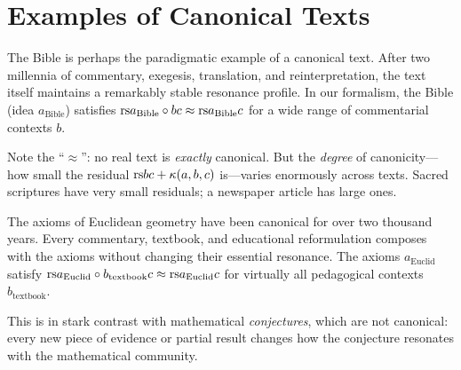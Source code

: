 \section{Examples of Canonical Texts}

\begin{example}
\label{ex:scripture}
The Bible is perhaps the paradigmatic example of a canonical text.  After two
millennia of commentary, exegesis, translation, and reinterpretation, the
text itself maintains a remarkably stable resonance profile.  In our formalism,
the Bible (idea $a_{\mathrm{Bible}}$) satisfies
$\mathrm{rs}{a_{\mathrm{Bible}} \circ b}{c} \approx \mathrm{rs}{a_{\mathrm{Bible}}}{c}$
for a wide range of commentarial contexts $b$.

Note the ``$\approx$'': no real text is \emph{exactly} canonical.  But the
\emph{degree} of canonicity---how small the residual
$\mathrm{rs}{b}{c} + \kappa(a, b, c)$ is---varies enormously across texts.  Sacred
scriptures have very small residuals; a newspaper article has large ones.
\end{example}

\begin{example}
\label{ex:axioms}
The axioms of Euclidean geometry have been canonical for over two thousand
years.  Every commentary, textbook, and educational reformulation composes
with the axioms without changing their essential resonance.  The axioms
$a_{\mathrm{Euclid}}$ satisfy
$\mathrm{rs}{a_{\mathrm{Euclid}} \circ b_{\mathrm{textbook}}}{c}
\approx \mathrm{rs}{a_{\mathrm{Euclid}}}{c}$
for virtually all pedagogical contexts $b_{\mathrm{textbook}}$.

This is in stark contrast with mathematical \emph{conjectures}, which are not
canonical: every new piece of evidence or partial result changes how the
conjecture resonates with the mathematical community.
\end{example}

